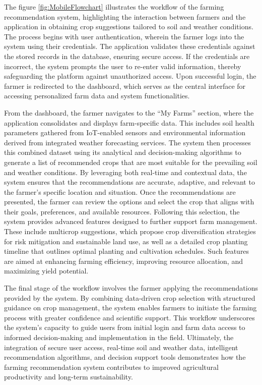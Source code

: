 {	The figure \ref{fig:MobileFlowchart} illustrates the workflow of the farming recommendation system, highlighting the interaction between farmers and the application in obtaining crop suggestions tailored to soil and weather conditions. The process begins with user authentication, wherein the farmer logs into the system using their credentials. The application validates these credentials against the stored records in the database, ensuring secure access. If the credentials are incorrect, the system prompts the user to re-enter valid information, thereby safeguarding the platform against unauthorized access. Upon successful login, the farmer is redirected to the dashboard, which serves as the central interface for accessing personalized farm data and system functionalities.
	
	From the dashboard, the farmer navigates to the “My Farms” section, where the application consolidates and displays farm-specific data. This includes soil health parameters gathered from IoT-enabled sensors and environmental information derived from integrated weather forecasting services. The system then processes this combined dataset using its analytical and decision-making algorithms to generate a list of recommended crops that are most suitable for the prevailing soil and weather conditions. By leveraging both real-time and contextual data, the system ensures that the recommendations are accurate, adaptive, and relevant to the farmer’s specific location and situation. Once the recommendations are presented, the farmer can review the options and select the crop that aligns with their goals, preferences, and available resources. Following this selection, the system provides advanced features designed to further support farm management. These include multicrop suggestions, which propose crop diversification strategies for risk mitigation and sustainable land use, as well as a detailed crop planting timeline that outlines optimal planting and cultivation schedules. Such features are aimed at enhancing farming efficiency, improving resource allocation, and maximizing yield potential.
	
	The final stage of the workflow involves the farmer applying the recommendations provided by the system. By combining data-driven crop selection with structured guidance on crop management, the system enables farmers to initiate the farming process with greater confidence and scientific support. This workflow underscores the system’s capacity to guide users from initial login and farm data access to informed decision-making and implementation in the field. Ultimately, the integration of secure user access, real-time soil and weather data, intelligent recommendation algorithms, and decision support tools demonstrates how the farming recommendation system contributes to improved agricultural productivity and long-term sustainability.
	
}
